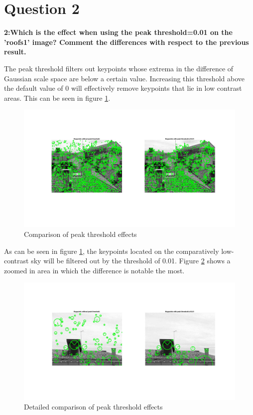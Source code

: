 \section{Question 2}

{\bfseries 2:Which is the effect when using the peak threshold=0.01 on the
'roofs1' image? Comment the differences with respect to the previous result.}

The peak threshold filters out keypoints whose extrema in the difference of Gaussian scale space are below a certain value. Increasing this threshold above the default value of 0 will effectively remove keypoints that lie in low contrast areas. This can be seen in figure \ref{fig:diff_peak_thresh}.

\begin{figure}[!hbt]
  \includegraphics[width=\textwidth]{img/diff_peak_thresh}
  \caption{Comparison of peak threshold effects}
  \label{fig:diff_peak_thresh}
\end{figure}

As can be seen in figure \ref{fig:diff_peak_thresh}, the keypoints located on the comparatively low-contrast sky will be filtered out by the threshold of 0.01. Figure \ref{fig:diff_peak_thresh2} shows a zoomed in area in which the difference is notable the most.

\begin{figure}[!hbt]
  \includegraphics[width=\textwidth]{img/diff_peak_thresh2}
  \caption{Detailed comparison of peak threshold effects}
  \label{fig:diff_peak_thresh2}
\end{figure}

